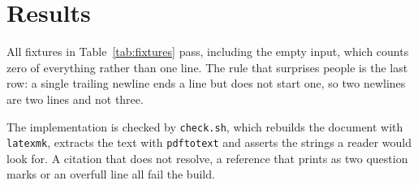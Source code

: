 \section{Results}
\label{sec:results}

All fixtures in Table~\ref{tab:fixtures} pass, including the empty input, which counts
zero of everything rather than one line. The rule that surprises people is the last
row: a single trailing newline ends a line but does not start one, so two newlines are
two lines and not three.

The implementation is checked by \texttt{check.sh}, which rebuilds the document with
\texttt{latexmk}, extracts the text with \texttt{pdftotext} and asserts the strings a
reader would look for. A citation that does not resolve, a reference that prints as two question marks or
an overfull line all fail the build.
